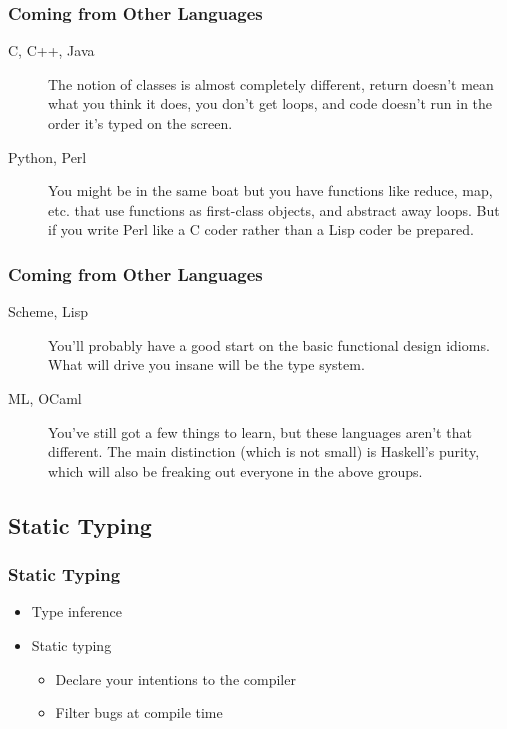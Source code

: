 \documentclass{beamer}
\begin{document}
\begin{frame}[fragile]
  \frametitle{Coming from Other Languages}
  \begin{description}

  \item[C, C++, Java] The notion of classes is almost completely different, return doesn't mean what you think it does, you don't get loops, and code doesn't run in the order it's typed on the screen.

  \item[Python, Perl] You might be in the same boat but you have functions like reduce, map, etc. that use functions as first-class objects, and abstract away loops. But if you write Perl like a C coder rather than a Lisp coder be prepared.

    \end{description}
\end{frame}

\begin{frame}[fragile]
  \frametitle{Coming from Other Languages}
  \begin{description}

  \item[Scheme, Lisp] You'll probably have a good start on the basic functional design idioms. What will drive you insane will be the type system.

  \item[ML, OCaml] You've still got a few things to learn, but these languages aren't that different. The main distinction (which is not small) is Haskell's purity, which will also be freaking out everyone in the above groups.

  \end{description}
\end{frame}

\subsection{Static Typing}

\begin{frame}[fragile]
  \frametitle{Static Typing}
  \begin{itemize}
  \item Type inference
  \item Static typing
    \begin{itemize}
    \item Declare your intentions to the compiler
    \item Filter bugs at compile time
    \end{itemize}
  \end{itemize}
\end{frame}
\end{document}
